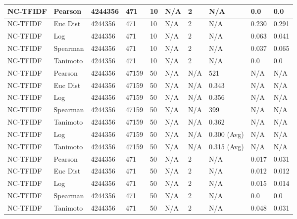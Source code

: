 \documentclass{article}
\begin{document}
\begin{longtable}{ |p{1.7cm}|p{1.9cm}|p{1.5cm}|p{1.5cm}|p{0.75cm}|p{0.75cm}|p{0.75cm}|p{0.75cm}|p{1.5cm}|p{1.5cm}|}
    NC-TFIDF  & Pearson & 4244356 & 471 & 10 & N/A  & 2 & N/A & 0.0 & 0.0  \\ \hline
    NC-TFIDF  & Euc Dist & 4244356 & 471 & 10 & N/A  & 2 & N/A & 0.230 & 0.291   \\ \hline
    NC-TFIDF  & Log & 4244356 & 471& 10 & N/A & 2 & N/A & 0.063 & 0.041  \\ \hline
    NC-TFIDF  & Spearman & 4244356 & 471 & 10 & N/A  & 2 & N/A &0.037 & 0.065 \\ \hline
    NC-TFIDF  & Tanimoto & 4244356 & 471 & 10 & N/A  & 2 & N/A & 0.0 & 0.0 \\ \hline
    
    NC-TFIDF & Pearson & 4244356 & 47159 & 50 & N/A & N/A & 521 & N/A & N/A  \\ \hline
    NC-TFIDF  & Euc Dist & 4244356 & 47159 & 50 & N/A & N/A & 0.343 & N/A & N/A   \\ \hline
    NC-TFIDF  & Log & 4244356 & 47159 &  50 & N/A & N/A & 0.356 & N/A & N/A  \\ \hline
    NC-TFIDF  & Spearman & 4244356 & 47159 & 50 & N/A & N/A & 399 & N/A & N/A \\ \hline
    NC-TFIDF  & Tanimoto & 4244356 & 47159 & 50 & N/A& N/A & 0.362 & N/A & N/A \\ \hline
    NC-TFIDF  & Log & 4244356 & 47159 & 50 & N/A& N/A & 0.300 (Avg) & N/A & N/A \\ \hline
    NC-TFIDF  & Tanimoto & 4244356 & 47159 & 50 & N/A & N/A & 0.315 (Avg) & N/A & N/A \\ \hline
    
    NC-TFIDF  & Pearson & 4244356 & 471 & 50 & N/A  & 2 & N/A & 0.017 & 0.031  \\ \hline
    NC-TFIDF  & Euc Dist & 4244356 & 471 & 50 & N/A  & 2 & N/A &0.012 & 0.012   \\ \hline
    NC-TFIDF  & Log & 4244356 & 471 & 50 & N/A & 2 & N/A & 0.015 & 0.014  \\ \hline
    NC-TFIDF  & Spearman & 4244356 & 471& 50 & N/A  & 2 & N/A &0.0 & 0.0 \\ \hline
    NC-TFIDF  & Tanimoto & 4244356 & 471 & 50 & N/A  & 2 & N/A & 0.048 & 0.031 \\ \hline
   

\end{longtable}
\end{document}
